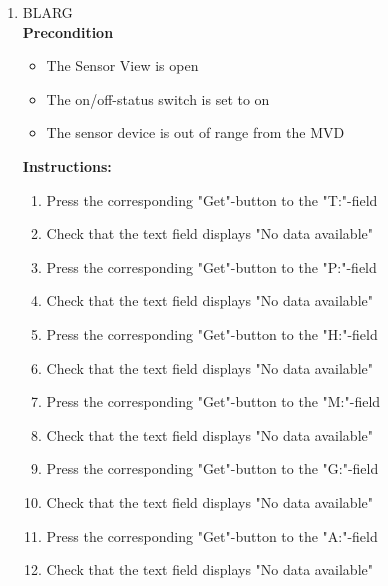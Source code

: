 \documentclass[a4paper]{article}
\newlength{\testlabellength}
\newenvironment{testlist}{\begin{enumerate}[label=\bfseries Instruction \thesubsection.\arabic* , labelindent=0pt, labelwidth=\testlabellength , leftmargin=2cm]}{\end{enumerate}}
\newenvironment{precondition}{
{\color{white}BLARG}\\ 
\textbf{Precondition}
\begin{itemize}[labelindent=0cm, labelwidth=2cm , leftmargin=1cm]
}
{\end{itemize}}
\newenvironment{instruction}{
\textbf{Instructions:}
\begin{enumerate}[label=\bfseries  \arabic*., labelindent=0cm, labelwidth=2cm , leftmargin=1cm]
}
{\end{enumerate}}
\newenvironment{postcondition}{
\textbf{Postcondition:}
\begin{itemize}[labelindent=0cm, labelwidth=2cm , leftmargin=1cm]
}
{\end{itemize}}
\begin{document}
\begin{appendices}
\begin{testlist}
	\item
		\begin{precondition}
			\item The Sensor View is open
			\item The on/off-status switch is set to on
			\item The sensor device is out of range from the MVD
		\end{precondition}
		\begin{instruction}
			\item Press the corresponding "Get"-button to the "T:"-field
		    \item Check that the text field displays "No data available"
			\item Press the corresponding "Get"-button to the "P:"-field
			\item Check that the text field displays "No data available"
			\item Press the corresponding "Get"-button to the "H:"-field
			\item Check that the text field displays "No data available"
			\item Press the corresponding "Get"-button to the "M:"-field
			\item Check that the text field displays "No data available"
			\item Press the corresponding "Get"-button to the "G:"-field
			\item Check that the text field displays "No data available"
			\item Press the corresponding "Get"-button to the "A:"-field
			\item Check that the text field displays "No data available"
    	\end{instruction}




\end{testlist}
\end{appendices}
\end{document}
